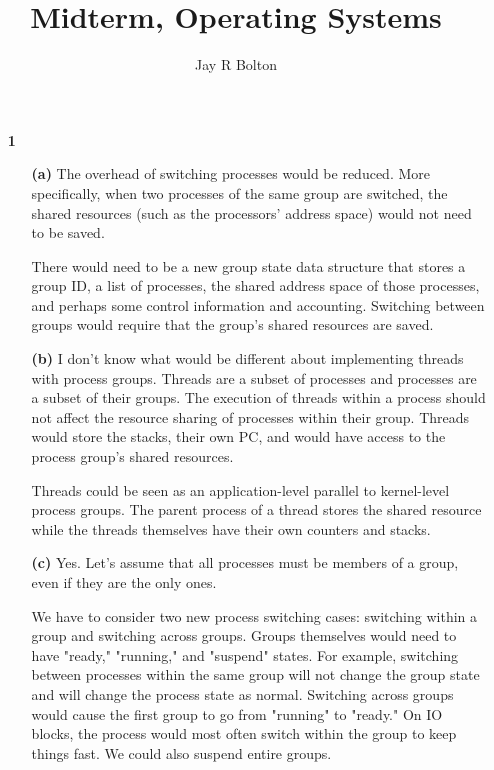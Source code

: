 \documentclass{article}
\title{Midterm, Operating Systems}
\author{Jay R Bolton}
\begin{document}
\maketitle

\begin{enumerate}

\item[\textbf{1}]
  \begin{enumerate}
    \item[\textbf{(a)}]
    The overhead of switching processes would be reduced. More specifically,
    when two processes of the same group are switched, the shared resources
    (such as the processors' address space) would not need to be saved.


    There would need to be a new group state data structure that stores a group
    ID, a list of processes, the shared address space of those processes, and
    perhaps some control information and accounting. Switching between groups
    would require that the group's shared resources are saved.

    \item[\textbf{(b)}]
     I don't know what would be different about implementing threads with 
     process groups. Threads are a subset of processes and processes are a
     subset of their groups. The execution of threads within a process should
     not affect the resource sharing of processes within their group. Threads
     would store the stacks, their own PC, and would have access to the process
     group's shared resources.

     Threads could be seen as an application-level parallel to kernel-level
     process groups. The parent process of a thread stores the shared resource
     while the threads themselves have their own counters and stacks.

    \item[\textbf{(c)}]
     Yes. Let's assume that all processes must be members of a group, even if
     they are the only ones. 

     We have to consider two new process switching cases: switching within a
     group and switching across groups. Groups themselves would need to have
     "ready," "running," and "suspend" states. For example, switching between
     processes within the same group will not change the group state and will
     change the process state as normal. Switching across groups would cause
     the first group to go from "running" to "ready." On IO blocks, the process
     would most often switch within the group to keep things fast. We could
     also suspend entire groups.


\end{enumerate}
\end{enumerate}
\end{document}
